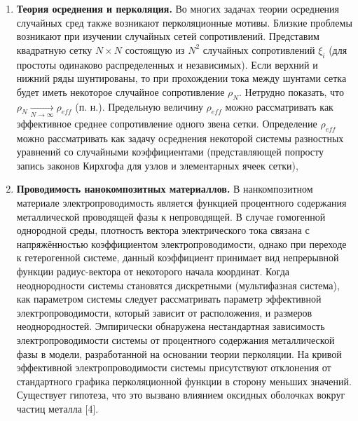 \begin{enumerate}
    \item \label{averaging}
    \textbf{Теория осреднения и перколяция.} \newline
        Во многих задачах теории осреднения случайных сред также возникают перколяционные мотивы. Близкие проблемы возникают при изучении случайных сетей сопротивлений. Представим квадратную сетку $N \times N$ состоящую из $N^2$ случайных сопротивлений $\xi_{i}$ (для простоты одинаково распределенных и независимых). Если верхний и нижний ряды шунтированы, то при прохождении тока между шунтами сетка будет иметь некоторое случайное сопротивление $\rho_{N}$. Нетрудно показать, что $\rho_{N}\xrightarrow[N\rightarrow\infty]{}\rho_{eff}$ (п. н.). Предельную величину $\rho_{eff}$ можно рассматривать как эффективное среднее сопротивление одного звена сетки. Определение $\rho_{eff}$ можно рассматривать как задачу осреднения некоторой системы разностных уравнений со случайными коэффициентами (представляющей попросту запись законов Кирхгофа для узлов и элементарных ячеек сетки),
    \item \label{nanocomposites}
    \textbf{Проводимость нанокомпозитных материаллов.}
        В нанкомпозитном материале электропроводимость является функцией процентного содержания металлической проводящей фазы к непроводящей. В случае гомогенной однородной среды, плотность вектора электрического тока связана с напряжённостью коэффициентом электропроводимости, однако при переходе к гетерогенной системе, данный коэффициент принимает вид непрерывной функции радиус-вектора от некоторого начала координат. Когда неоднородности системы становятся дискретными (мультифазная система), как параметром системы следует рассматривать параметр эффективной электропроводимости, который зависит от расположения, и размеров неоднородностей. Эмпирически обнаружена нестандартная зависимость электропроводимости системы от процентного содержания металлической фазы в модели, разработанной на основании теории перколяции. На кривой эффективной электропроводимости системы присутствуют отклонения от стандартного графика перколяционной функции в сторону меньших значений. Существует гипотеза, что это вызвано влиянием оксидных оболочках вокруг частиц металла [4].
\end{enumerate}